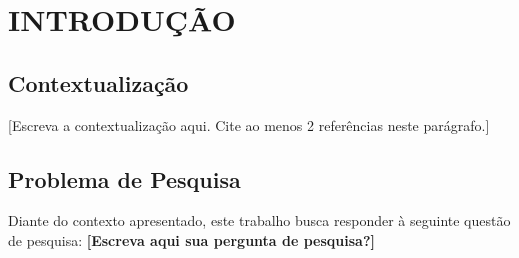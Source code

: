 %
%

\chapter{INTRODUÇÃO}


\section{Contextualização}

%

[Escreva a contextualização aqui. Cite ao menos 2 referências neste parágrafo.]



\section{Problema de Pesquisa}

%

Diante do contexto apresentado, este trabalho busca responder à seguinte questão de pesquisa: \textbf{[Escreva aqui sua pergunta de pesquisa?]}


